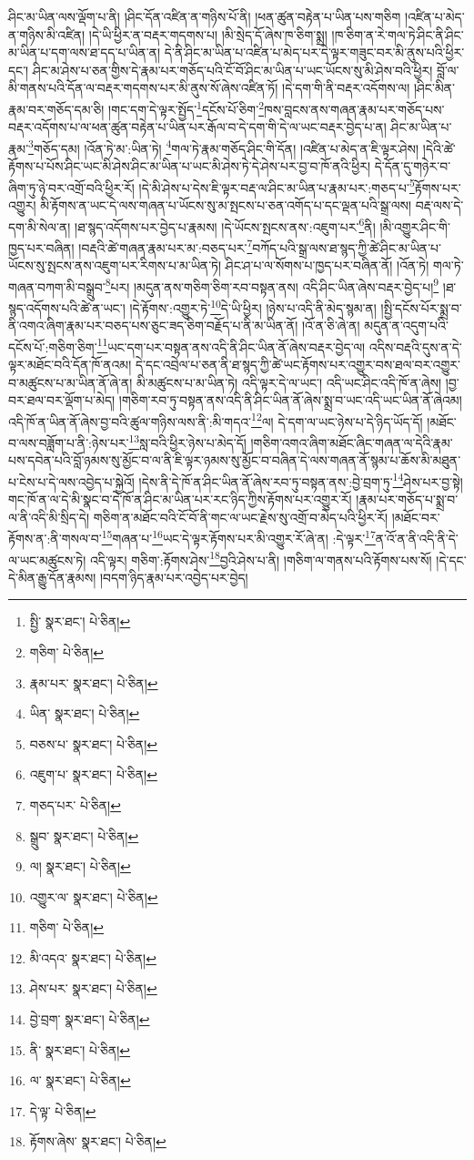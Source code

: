 ཤིང་མ་ཡིན་ལས་ལྡོག་པ་ནི། །ཤིང་དོན་འཛིན་ན་གཉིས་པོ་ནི། །ཕན་ཚུན་བརྟེན་པ་ཡིན་པས་གཅིག །འཛིན་པ་མེད་ན་གཉིས་མི་འཛིན། །དེ་ཡི་ཕྱིར་ན་བརྡར་གདགས་པ། །མི་སྲེད་དོ་ཞེས་ཁ་ཅིག་སྨྲ། །ཁ་ཅིག་ན་རེ་གལ་ཏེ་ཤིང་ནི་ཤིང་མ་ཡིན་པ་དག་ལས་ཐ་དད་པ་ཡིན་ན། དེ་ནི་ཤིང་མ་ཡིན་པ་འཛིན་པ་མེད་པར་དེ་ལྟར་གཟུང་བར་མི་ནུས་པའི་ཕྱིར་དང་། ཤིང་མ་ཤེས་པ་ཅན་གྱིས་དེ་རྣམ་པར་གཅོད་པའི་ངོ་བོ་ཤིང་མ་ཡིན་པ་ཡང་ཡོངས་སུ་མི་ཤེས་བའི་ཕྱིར། བློ་ལ་མི་གནས་པའི་དོན་ལ་བརྡར་གདགས་པར་མི་ནུས་སོ་ཞེས་འཛིན་ཏོ། །དེ་དག་གི་ནི་བརྡར་འདོགས་ལ། །ཤིང་མིན་རྣམ་བར་གཅོད་དམ་ཅི། །གང་དག་དེ་ལྟར་སྤྱོད་\footnote{སྤྱི་  སྣར་ཐང་།  པེ་ཅིན། }དངོས་པོ་ཅིག་\footnote{གཅིག་  པེ་ཅིན། }ཁས་བླངས་ནས་གཞན་རྣམ་པར་གཅོད་པས་བརྡར་འདོགས་པ་ལ་ཕན་ཚུན་བརྟེན་པ་ཡིན་པར་རྒོལ་བ་དེ་དག་གི་དེ་ལ་ཡང་བརྡར་བྱེད་པ་ན། ཤིང་མ་ཡིན་པ་རྣམ་\footnote{རྣམ་པར་  སྣར་ཐང་།  པེ་ཅིན། }གཅོད་དམ། །འོན་ཏེ་མ་:ཡིན་ཏེ། \footnote{ཡིན་  སྣར་ཐང་།  པེ་ཅིན། }གལ་ཏེ་རྣམ་གཅོད་ཤིང་གི་དོན། །འཛིན་པ་མེད་ན་ཇི་ལྟར་ཤེས། །དེའི་ཚེ་རྟོགས་པ་པོས་ཤིང་ཡང་མི་ཤེས་ཤིང་མ་ཡིན་པ་ཡང་མི་ཤེས་ཏེ་དེ་ཤེས་པར་བྱ་བ་ཁོ་ནའི་ཕྱིར། དེ་དོན་དུ་གཉེར་བ་ཞིག་ཏུ་ཉེ་བར་འགྲོ་བའི་ཕྱིར་རོ། །དེ་མི་ཤེས་པ་དེས་ཇི་ལྟར་བརྡ་ལ་ཤིང་མ་ཡིན་པ་རྣམ་པར་:གཅད་པ་\footnote{བཅས་པ་  སྣར་ཐང་།  པེ་ཅིན། }རྟོགས་པར་འགྱུར། མི་རྟོགས་ན་ཡང་དེ་ལས་གཞན་པ་ཡོངས་སུ་མ་སྤངས་པ་ཅན་འགོད་པ་དང་ལྡན་པའི་སྒྲ་ལས། བརྡ་ལས་དེ་དག་མི་སེལ་ན། །ཐ་སྙད་འདོགས་པར་བྱེད་པ་རྣམས། །དེ་ཡོངས་སྤངས་ནས་:འཇུག་པར་\footnote{འཇུག་པ་  སྣར་ཐང་།  པེ་ཅིན། }ནི། །མི་འགྱུར་ཤིང་གི་ཁྱད་པར་བཞིན། །བརྡའི་ཚེ་གཞན་རྣམ་པར་མ་:བཅད་པར་\footnote{གཅད་པར་  པེ་ཅིན། }བཀོད་པའི་སྒྲ་ལས་ཐ་སྙད་ཀྱི་ཚེ་ཤིང་མ་ཡིན་པ་ཡོངས་སུ་སྤངས་ནས་འཇུག་པར་རིགས་པ་མ་ཡིན་ཏེ། ཤིང་ཤ་པ་ལ་སོགས་པ་ཁྱད་པར་བཞིན་ནོ། །འོན་ཏེ། གལ་ཏེ་གཞན་བཀག་མི་བསྒྲུབ་\footnote{སྒྲུབ་  སྣར་ཐང་།  པེ་ཅིན། }པར། །མདུན་ནས་གཅིག་ཅིག་རབ་བསྟན་ནས། འདི་ཤིང་ཡིན་ཞེས་བརྡར་བྱེད་པ།\footnote{ལ།  སྣར་ཐང་།  པེ་ཅིན། } །ཐ་སྙད་འདོགས་པའི་ཚེ་ན་ཡང་། །དེ་རྟོགས་:འགྱུར་ཏེ་\footnote{འགྱུར་ལ་  སྣར་ཐང་།  པེ་ཅིན། }དེ་ཡི་ཕྱིར། །ཉེས་པ་འདི་ནི་མེད་སྙམ་ན། །སྤྱི་དངོས་པོར་སྨྲ་བ་ནི་འགའ་ཞིག་རྣམ་པར་བཅད་པས་ཅུང་ཟད་ཅིག་བརྗོད་པ་ནི་མ་ཡིན་ནོ། །འོ་ན་ཅི་ཞེ་ན། མདུན་ན་འདུག་པའི་དངོས་པོ་:གཅིག་ཅིག་\footnote{གཅིག་  པེ་ཅིན། }ཡང་དག་པར་བསྟན་ནས་འདི་ནི་ཤིང་ཡིན་ནོ་ཞེས་བརྡར་བྱེད་ལ། འདིས་བརྡའི་དུས་ན་དེ་ལྟར་མཐོང་བའི་དོན་ཁོ་ནའམ། དེ་དང་འབྲེལ་པ་ཅན་ནི་ཐ་སྙད་ཀྱི་ཚེ་ཡང་རྟོགས་པར་འགྱུར་བས་ཐལ་བར་འགྱུར་བ་མཚུངས་པ་མ་ཡིན་ནོ་ཞེ་ན། མི་མཚུངས་པ་མ་ཡིན་ཏེ། འདི་ལྟར་དེ་ལ་ཡང་། འདི་ཡང་ཤིང་འདི་ཁོ་ན་ཞེས། །བྱ་བར་ཐལ་བར་ལྡོག་པ་མེད། །གཅིག་རབ་ཏུ་བསྟན་ནས་འདི་ནི་ཤིང་ཡིན་ནོ་ཞེས་སྨྲ་བ་ཡང་འདི་ཡང་ཡིན་ནོ་ཞེའམ། འདི་ཁོ་ན་ཡིན་ནོ་ཞེས་བྱ་བའི་ཚུལ་གཉིས་ལས་ནི་:མི་གདའ་\footnote{མི་འདའ་  སྣར་ཐང་།  པེ་ཅིན། }ལ། དེ་དག་ལ་ཡང་ཉེས་པ་དེ་ཉིད་ཡོད་དོ། །མཐོང་བ་ལས་བཟློག་པ་ནི་:ཉེས་པར་\footnote{ཤེས་པར་  སྣར་ཐང་།  པེ་ཅིན། }སླ་བའི་ཕྱིར་ཉེས་པ་མེད་དོ། །གཅིག་འགའ་ཞིག་མཐོང་ཞིང་གཞན་ལ་དེའི་རྣམ་པས་དབེན་པའི་བློ་ཉམས་སུ་མྱོང་བ་ལ་ནི་ཇི་ལྟར་ཉམས་སུ་མྱོང་བ་བཞིན་དེ་ལས་གཞན་ནོ་སྙམ་པ་ཆོས་མི་མཐུན་པ་ངེས་པ་དེ་ལས་འབྱེད་པ་སྐྱེའོ། །དེས་ནི་དེ་ཁོ་ན་ཤིང་ཡིན་ནོ་ཞེས་རབ་ཏུ་བསྟན་ནས་:བྱེ་བྲག་ཏུ་\footnote{བྱེ་བྲག་  སྣར་ཐང་།  པེ་ཅིན། }ཤེས་པར་བྱ་སྟེ། གང་ཁོ་ན་ལ་དེ་མི་སྣང་བ་དེ་ཁོ་ན་ཤིང་མ་ཡིན་པར་རང་ཉིད་ཀྱིས་རྟོགས་པར་འགྱུར་རོ། །རྣམ་པར་གཅོད་པ་སྨྲ་བ་ལ་ནི་འདི་མི་སྲིད་དེ། གཅིག་ན་མཐོང་བའི་ངོ་བོ་ནི་གང་ལ་ཡང་རྗེས་སུ་འགྲོ་བ་མེད་པའི་ཕྱིར་རོ། །མཐོང་བར་རྟོགས་ན་:ནི་གསལ་བ་\footnote{ནི་  སྣར་ཐང་།  པེ་ཅིན། }གཞན་པ་\footnote{ལ་  སྣར་ཐང་།  པེ་ཅིན། }ཡང་དེ་ལྟར་རྟོགས་པར་མི་འགྱུར་རོ་ཞེ་ན། :དེ་ལྟར་\footnote{དེ་ལྟ་  པེ་ཅིན། }ན་འོ་ན་ནི་འདི་ནི་དེ་ལ་ཡང་མཚུངས་ཏེ། འདི་ལྟར། གཅིག་:རྟོགས་ཤེས་\footnote{རྟོགས་ཞེས་  སྣར་ཐང་།  པེ་ཅིན། }བྱའི་ཤེས་པ་ནི། །གཅིག་ལ་གནས་པའི་རྟོགས་པས་སོ། །དེ་དང་དེ་མིན་རྒྱུ་དོན་རྣམས། །བདག་ཉིད་རྣམ་པར་འབྱེད་པར་བྱེད། 